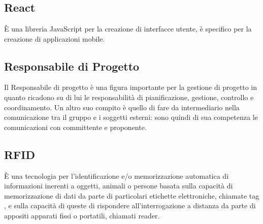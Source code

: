 \section{}
\subsection*{React} È una libreria JavaScript per la creazione di interfacce utente, è specifico per la creazione di applicazioni mobile.

\subsection*{Responsabile di Progetto} Il Responsabile di progetto è una figura importante per la gestione di progetto in quanto ricadono su di lui le responsabilità di pianificazione, gestione, controllo e coordinamento. Un altro suo compito è quello di fare da intermediario nella comunicazione tra il gruppo e i soggetti esterni: sono quindi di sua competenza le comunicazioni con committente e proponente.

\subsection*{RFID} È una tecnologia per l'identificazione e/o memorizzazione automatica di informazioni inerenti a oggetti, animali o persone  basata sulla capacità di memorizzazione di dati da parte di particolari etichette elettroniche, chiamate tag , e sulla capacità di queste di rispondere all'interrogazione a distanza da parte di appositi apparati fissi o portatili, chiamati reader.
\newpage